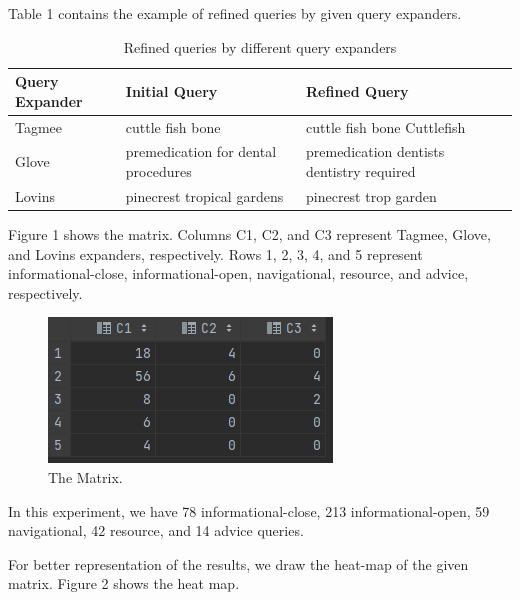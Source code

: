 \documentclass[sigconf]{acmart}
\begin{document}
Table 1 contains the example of refined queries by given query expanders.

\begin{table}[h]
\begin{tabularx}{0.43\textwidth} { 
  | >{\raggedright\arraybackslash}X 
  | >{\centering\arraybackslash}X 
  | >{\centering\arraybackslash}X
  | >{\raggedright\arraybackslash}X | }
 \hline
Query Expander & Initial Query & Refined Query \\
 \hline
Tagmee  & cuttle fish bone & cuttle fish bone Cuttlefish \\
 \hline
Glove  & premedication for dental procedures & premedication dentists dentistry required\\
\hline 
Lovins  & pinecrest tropical gardens & pinecrest trop garden\\
\hline
\end{tabularx}
\caption{\label{tab:table-name}Refined queries by different query expanders }
\end{table}

Figure 1 shows the matrix. Columns C1, C2, and C3 represent Tagmee, Glove, and Lovins expanders, respectively. Rows 1, 2, 3, 4, and 5 represent informational-close, informational-open, navigational, resource, and advice, respectively.

\begin{figure}[h]
\centering
\includegraphics[width=0.8\columnwidth]{Images/matrix.png}
\caption{The Matrix.\label{neural_net}}
\end{figure}

In this experiment, we have 78 informational-close, 213 informational-open, 59 navigational, 42 resource, and 14 advice queries. 

For better representation of the results, we draw the heat-map of the given matrix. Figure 2 shows the heat map.
\end{document}
